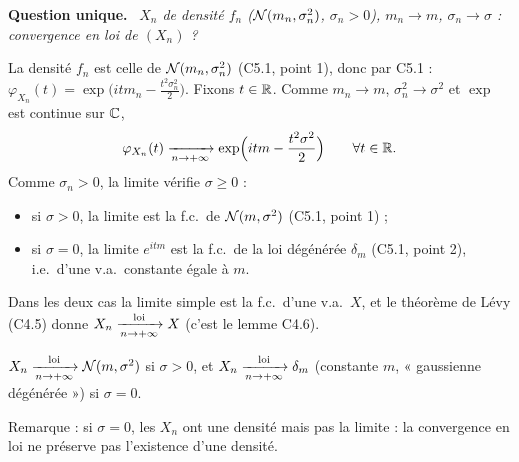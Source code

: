 \documentclass[11pt,a4paper]{article}
\newcommand{\question}[1]{\par\medskip\noindent\textbf{Question #1.}~}
\begin{document}
\begin{exo}

\question{unique} \emph{$X_n$ de densité $f_n$ ($\mathcal{N}(m_n,\sigma_n^2)$, $\sigma_n>0$), $m_n\to m$, $\sigma_n\to\sigma$ : convergence en loi de $(X_n)$ ?}

La densité $f_n$ est celle de $\mathcal{N}(m_n,\sigma_n^2)$ (C5.1, point 1), donc par C5.1 : $\varphi_{X_n}(t)=\exp\bigl(itm_n-\frac{t^2\sigma_n^2}2\bigr)$.
Fixons $t\in\mathbb{R}$. Comme $m_n\to m$, $\sigma_n^2\to\sigma^2$ et $\exp$ est continue sur $\mathbb{C}$,
\[\varphi_{X_n}(t)\xrightarrow[n\to+\infty]{}\exp\Bigl(itm-\frac{t^2\sigma^2}2\Bigr)\qquad\forall t\in\mathbb{R} .\]
Comme $\sigma_n>0$, la limite vérifie $\sigma\ge0$ :
\begin{itemize}
  \item si $\sigma>0$, la limite est la f.c.\ de $\mathcal{N}(m,\sigma^2)$ (C5.1, point 1) ;
  \item si $\sigma=0$, la limite $e^{itm}$ est la f.c.\ de la loi dégénérée $\delta_m$ (C5.1, point 2), i.e.\ d'une v.a.\ constante égale à $m$.
\end{itemize}
Dans les deux cas la limite simple est la f.c.\ d'une v.a.\ $X$, et le théorème de Lévy (C4.5) donne $X_n\xrightarrow[n\to+\infty]{\text{loi}} X$ (c'est le
lemme C4.6).
\begin{resultat}
$X_n\xrightarrow[n\to+\infty]{\text{loi}}\mathcal{N}(m,\sigma^2)$ si $\sigma>0$, et $X_n\xrightarrow[n\to+\infty]{\text{loi}}\delta_m$ (constante $m$, « gaussienne dégénérée ») si $\sigma=0$.
\end{resultat}
Remarque : si $\sigma=0$, les $X_n$ ont une densité mais pas la limite : la convergence en loi ne préserve pas l'existence d'une densité.
\end{exo}
\end{document}
